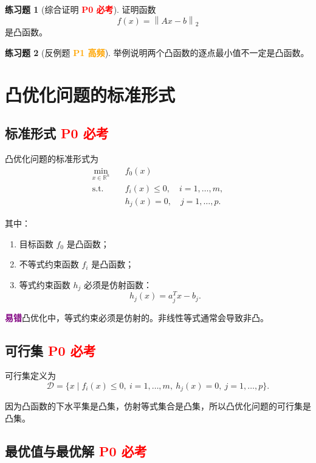 \documentclass[11pt,a4paper]{ctexart}
\newcommand{\R}{\mathbb{R}}
\newcommand{\st}{\text{s.t.}}
\newcommand{\norm}[1]{\left\lVert #1 \right\rVert}
\newcommand{\Pzero}{\textcolor{red}{\textbf{P0 必考}}}
\newcommand{\Pone}{\textcolor{orange}{\textbf{P1 高频}}}
\newcommand{\warn}{\textcolor{purple}{\textbf{易错}}}
\theoremstyle{definition}
\newtheorem{exercise}{练习题}[section]
\theoremstyle{plain}
\theoremstyle{remark}
\begin{document}
\begin{exercise}[综合证明 \Pzero]
证明函数
\[
    f(x)=\norm{Ax-b}_2
\]
是凸函数。
\end{exercise}

\begin{exercise}[反例题 \Pone]
举例说明两个凸函数的逐点最小值不一定是凸函数。
\end{exercise}

\newpage

\section{凸优化问题的标准形式}

\subsection{标准形式 \Pzero}

凸优化问题的标准形式为
\[
\begin{aligned}
    \min_{x\in\R^n}\quad & f_0(x)\\
    \st\quad & f_i(x)\le0,\quad i=1,\dots,m,\\
    & h_j(x)=0,\quad j=1,\dots,p.
\end{aligned}
\]

其中：

\begin{enumerate}[label=\arabic*.]
    \item 目标函数 $f_0$ 是凸函数；
    \item 不等式约束函数 $f_i$ 是凸函数；
    \item 等式约束函数 $h_j$ 必须是仿射函数：
    \[
        h_j(x)=a_j^Tx-b_j.
    \]
\end{enumerate}

\warn{凸优化中，等式约束必须是仿射的。非线性等式通常会导致非凸。}

\subsection{可行集 \Pzero}

可行集定义为
\[
    \mathcal{D}
    =
    \{x\mid f_i(x)\le0,\ i=1,\dots,m,\ h_j(x)=0,\ j=1,\dots,p\}.
\]

因为凸函数的下水平集是凸集，仿射等式集合是凸集，所以凸优化问题的可行集是凸集。

\subsection{最优值与最优解 \Pzero}
\end{document}
